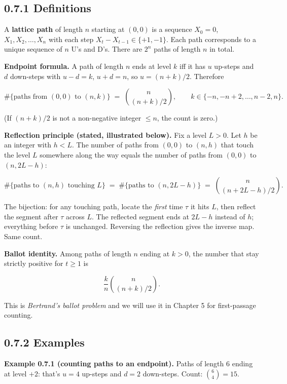\documentclass[
  10pt,
  twoside]{book}
\begin{document}
\subsection{0.7.1 Definitions}\label{definitions-4}

A \textbf{lattice path} of length \(n\) starting at \((0, 0)\) is a
sequence \(X_0 = 0\), \(X_1, X_2, \dots, X_n\) with each step
\(X_t - X_{t-1} \in \{+1, -1\}\). Each path corresponds to a unique
sequence of \(n\) U's and D's. There are \(2^n\) paths of length \(n\)
in total.

\textbf{Endpoint formula.} A path of length \(n\) ends at level \(k\)
iff it has \(u\) up-steps and \(d\) down-steps with \(u - d = k\),
\(u + d = n\), so \(u = (n + k)/2\). Therefore

\[\#\{\text{paths from } (0, 0) \text{ to } (n, k)\} \;=\; \binom{n}{(n+k)/2}, \qquad k \in \{-n, -n+2, \dots, n-2, n\}.\]

(If \((n + k)/2\) is not a non-negative integer \(\leq n\), the count is
zero.)

\textbf{Reflection principle (stated, illustrated below).} Fix a level
\(L > 0\). Let \(h\) be an integer with \(h < L\). The number of paths
from \((0, 0)\) to \((n, h)\) that touch the level \(L\) somewhere along
the way equals the number of paths from \((0, 0)\) to \((n, 2L - h)\):

\[\#\{\text{paths to } (n, h) \text{ touching } L\} \;=\; \#\{\text{paths to } (n, 2L - h)\} \;=\; \binom{n}{(n + 2L - h)/2}.\]

The bijection: for any touching path, locate the \emph{first} time
\(\tau\) it hits \(L\), then reflect the segment after \(\tau\) across
\(L\). The reflected segment ends at \(2L - h\) instead of \(h\);
everything before \(\tau\) is unchanged. Reversing the reflection gives
the inverse map. Same count.

\textbf{Ballot identity.} Among paths of length \(n\) ending at
\(k > 0\), the number that stay strictly positive for \(t \geq 1\) is

\[\frac{k}{n} \binom{n}{(n+k)/2}.\]

This is \emph{Bertrand's ballot problem} and we will use it in Chapter 5
for first-passage counting.

\subsection{0.7.2 Examples}\label{examples-6}

\textbf{Example 0.7.1 (counting paths to an endpoint).} Paths of length
6 ending at level \(+2\): that's \(u = 4\) up-steps and \(d = 2\)
down-steps. Count: \(\binom{6}{4} = 15\).
\end{document}
